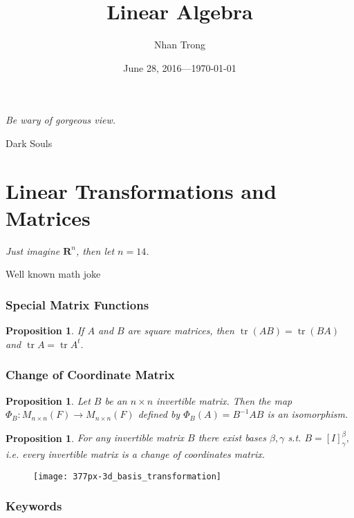 \documentclass[12pt]{article}
\title{Linear Algebra}
\author{Nhan Trong}
\date{June 28, 2016---\today}
\theoremstyle{plain}
\newtheorem{proposition}[theorem]{Proposition}
\theoremstyle{definition}
\theoremstyle{remark}
\newcommand{\R}{\mathbf R}
\DeclareMathOperator{\tr}{tr}
\begin{document}
\maketitle

\epigraph{\textit{Be wary of gorgeous view.}}{Dark Souls}

\tableofcontents %

\part{Linear Transformations and Matrices}

\epigraph{\textit{Just imagine $\R^n$, then let $n = 14$.}}{Well known math joke}

\section{Special Matrix Functions}

\begin{proposition}\label{tracecommutative}
If $A$ and $B$ are square matrices, then $\tr(AB) = \tr(BA)$ and $\tr A = \tr A^t.$
\end{proposition}

\section{Change of Coordinate Matrix}

\begin{proposition}\label{matrixbasisrep}
Let $B$ be an $n \times n$ invertible matrix. Then the map $\Phi_B: M_{n\times n}(F) \longrightarrow M_{n\times n}(F)$ defined by $\Phi_B(A) = B^{-1} A B$ is an isomorphism.
\end{proposition}

\begin{proposition}
For any invertible matrix $B$ there exist bases $\beta, \gamma$ s.t. $B = [I]^\beta_\gamma,$ i.e. every invertible matrix is a change of coordinates matrix.
\end{proposition}

\begin{figure}[H]
\centering
\texttt{[image: 377px-3d\_basis\_transformation]}
\end{figure}

\section*{Keywords}
\end{document}
